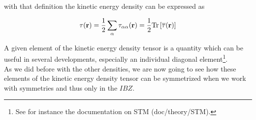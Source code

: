 \documentclass[a4paper,12pt]{report}
\begin{document}
with that definition the kinetic energy density can be expressed as

\begin{equation}
\tau(\mathbf{r}) = \frac{1}{2} \sum_{\alpha} \tau_{\alpha\alpha}(\mathbf{r}) = \frac{1}{2} {\rm Tr} \left[ \overline{\tau}(\mathbf{r}) \right]
\end{equation}

A given element of the kinetic energy density tensor is a quantity which can be useful in several developments, especially an individual diagonal element\footnote{See for instance the documentation on STM (doc/theory/STM).}.\\
As we did before with the other densities, we are now going to see how these elements of the kinetic energy density tensor can be symmetrized when we work with symmetries and thus only in the $IBZ$.
\end{document}
